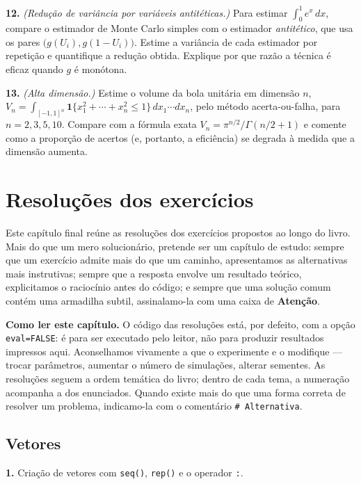 \documentclass[
  portuguese,
  11pt,
  openany]{book}
\begin{document}
\textbf{12.} \emph{(Redução de variância por variáveis antitéticas.)} Para estimar
\(\int_0^1 e^x\, dx\), compare o estimador de Monte Carlo simples com o estimador
\emph{antitético}, que usa os pares \(\big(g(U_i), g(1 - U_i)\big)\). Estime a variância
de cada estimador por repetição e quantifique a redução obtida. Explique por que
razão a técnica é eficaz quando \(g\) é monótona.

\textbf{13.} \emph{(Alta dimensão.)} Estime o volume da bola unitária em dimensão \(n\),
\(\displaystyle V_n = \int_{[-1,1]^n} \mathbf{1}\{x_1^2 + \cdots + x_n^2 \leq 1\}\,
dx_1\cdots dx_n\), pelo método acerta-ou-falha, para \(n = 2, 3, 5, 10\). Compare com
a fórmula exata \(V_n = \pi^{n/2}/\Gamma(n/2 + 1)\) e comente como a proporção de
acertos (e, portanto, a eficiência) se degrada à medida que a dimensão aumenta.

\chapter{Resoluções dos exercícios}\label{solucoes}

Este capítulo final reúne as resoluções dos exercícios propostos ao longo do
livro. Mais do que um mero solucionário, pretende ser um capítulo de estudo:
sempre que um exercício admite mais do que um caminho, apresentamos as
alternativas mais instrutivas; sempre que a resposta envolve um resultado
teórico, explicitamos o raciocínio antes do código; e sempre que uma solução
comum contém uma armadilha subtil, assinalamo-la com uma caixa de \textbf{Atenção}.

\textbf{Como ler este capítulo.} O código das resoluções está, por defeito, com a
opção \texttt{eval=FALSE}: é para ser executado pelo leitor, não para produzir
resultados impressos aqui. Aconselhamos vivamente a que o experimente e o
modifique --- trocar parâmetros, aumentar o número de simulações, alterar
sementes. As resoluções seguem a ordem temática do livro; dentro de cada tema,
a numeração acompanha a dos enunciados. Quando existe mais do que uma forma
correta de resolver um problema, indicamo-la com o comentário \texttt{\#\ Alternativa}.

\section{Vetores}\label{vetores}

\textbf{1.} Criação de vetores com \texttt{seq()}, \texttt{rep()} e o operador \texttt{:}.
\end{document}
